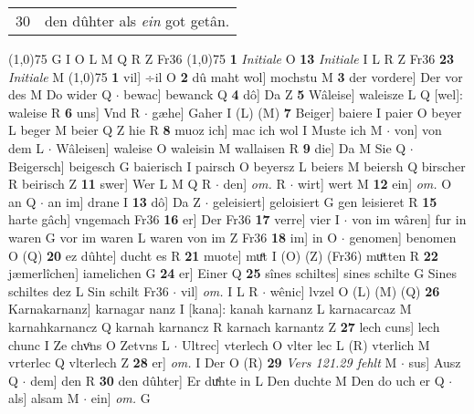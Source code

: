 \documentclass[8pt,a4paper,notitlepage]{article}
\begin{document}
\begin{table}[ht]
\begin{minipage}[t]{0.5\linewidth}
\begin{tabular}{rl}
30 & den dûhter als \textit{ein} got getân.\\ 
\end{tabular}
\scriptsize
\line(1,0){75} \newline
G I O L M Q R Z Fr36 \newline
\line(1,0){75} \newline
\textbf{1} \textit{Initiale} O  \textbf{13} \textit{Initiale} I L R Z Fr36  \textbf{23} \textit{Initiale} M  \newline
\line(1,0){75} \newline
\textbf{1} vil] ÷il O \textbf{2} dû maht wol] mochstu M \textbf{3} der vordere] Der vor des M Do wider Q  $\cdot$ bewac] bewanck Q \textbf{4} dô] Da Z \textbf{5} Wâleise] waleisze L Q [wel]: waleise R \textbf{6} uns] Vnd R  $\cdot$ gæhe] Gaher I (L) (M) \textbf{7} Beiger] baiere I paier O beyer L beger M beier Q Z hie R \textbf{8} muoz ich] mac ich wol I Muste ich M  $\cdot$ von] von dem L  $\cdot$ Wâleisen] waleise O waleisin M wallaisen R \textbf{9} die] Da M Sie Q  $\cdot$ Beigersch] beigesch G baierisch I pairsch O beyersz L beiers M beiersh Q birscher R beirisch Z \textbf{11} swer] Wer L M Q R  $\cdot$ den] \textit{om.} R  $\cdot$ wirt] wert M \textbf{12} ein] \textit{om.} O an Q  $\cdot$ an im] drane I \textbf{13} dô] Da Z  $\cdot$ geleisiert] geloisiert G gen leisieret R \textbf{15} harte gâch] vngemach Fr36 \textbf{16} er] Der Fr36 \textbf{17} verre] vier I  $\cdot$ von im wâren] fur in waren G vor im waren L waren von im Z Fr36 \textbf{18} im] in O  $\cdot$ genomen] benomen O (Q) \textbf{20} ez dûhte] ducht es R \textbf{21} muote] muͤt I (O) (Z) (Fr36) muͦtten R \textbf{22} jæmerlîchen] iamelichen G \textbf{24} er] Einer Q \textbf{25} sînes schiltes] sines schilte G Sines schiltes dez L Sin schilt Fr36  $\cdot$ vil] \textit{om.} I L R  $\cdot$ wênic] lvzel O (L) (M) (Q) \textbf{26} Karnakarnanz] karnagar nanz I [kana]: kanah karnanz L karnacarcaz M karnahkarnancz Q karnah karnancz R karnach karnantz Z \textbf{27} lech cuns] lech chunc I Ze chvͦns O Zetvns L  $\cdot$ Ultrec] vterlech O vlter lec L (R) vterlich M vrterlec Q vlterlech Z \textbf{28} er] \textit{om.} I Der O (R) \textbf{29} \textit{Vers 121.29 fehlt} M   $\cdot$ sus] Ausz Q  $\cdot$ dem] den R \textbf{30} den dûhter] Er duͯhte in L Den duchte M Den do uch er Q  $\cdot$ als] alsam M  $\cdot$ ein] \textit{om.} G \newline
\end{minipage}
\hspace{0.5cm}
\begin{minipage}[t]{0.5\linewidth}

\end{minipage}
\end{table}
\end{document}
